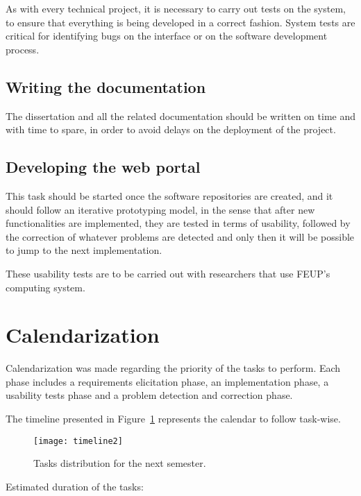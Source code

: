As with every technical project, it is necessary to carry out tests on the system, to ensure that everything is being developed in a correct fashion. System tests are critical for identifying bugs on the interface or on the software development process.

\subsection{Writing the documentation}\label{tasks:doc}

The dissertation and all the related documentation should be written on time and with time to spare, in order to avoid delays on the deployment of the project.

\subsection{Developing the web portal}\label{tasks:portal}

This task should be started once the software repositories are created, and it should follow an iterative prototyping model, in the sense that after new functionalities are implemented, they are tested in terms of usability, followed by the correction of whatever problems are detected and only then it will be possible to jump to the next implementation.

These usability tests are to be carried out with researchers that use FEUP's computing system.

\section{Calendarization}


Calendarization was made regarding the priority of the tasks to perform. Each phase includes a requirements elicitation phase, an implementation phase, a usability tests phase and a problem detection and correction phase.

The timeline presented in Figure~\ref{fig:timeline} represents the calendar to follow task-wise.

\begin{figure}[H]
  \begin{center}
    \leavevmode
    \texttt{[image: timeline2]}
    \caption{Tasks distribution for the next semester.}
    \label{fig:timeline}
  \end{center}
\end{figure}

Estimated duration of the tasks:

